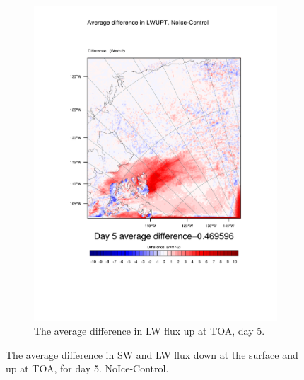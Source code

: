 \begin{figure}
\begin{subfigure}{0.48\textwidth}
		\includegraphics[width=\textwidth]{results/noice/diff_NoIce_LWUPT_Day5.pdf}
		\caption{The average difference in LW flux up at TOA, day 5.}
		\label{subfig:lwup_r2Day5}
	\end{subfigure}
	\caption{The average difference in SW and LW flux down at the surface and up at TOA, for day 5. NoIce-Control.}
	\label{fig:radiation_r2Day5}
\end{figure}

